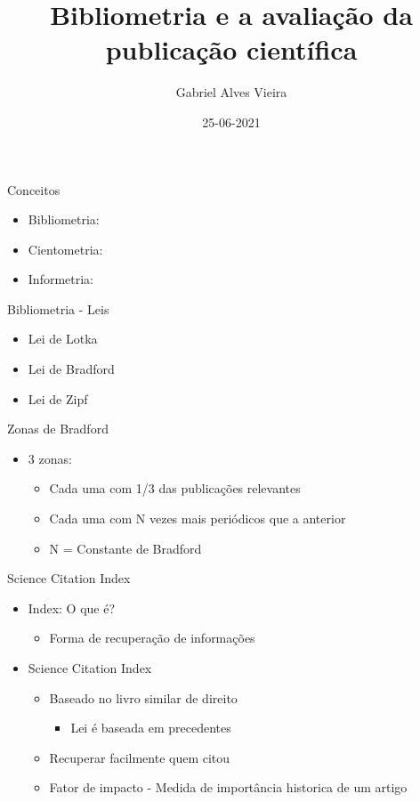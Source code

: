 \documentclass[bigger]{beamer}
\author{Gabriel Alves Vieira}
\date{25-06-2021}
\title{Bibliometria e a avaliação da publicação científica}
\begin{document}
\maketitle

\begin{frame}[label={sec:org1918bc8}]{Conceitos}
\begin{itemize}
\item Bibliometria:
\item Cientometria:
\item Informetria:
\end{itemize}
\end{frame}

\begin{frame}[label={sec:orgd7e64c2}]{Bibliometria - Leis}
\begin{itemize}
\item Lei de Lotka
\item Lei de Bradford
\item Lei de Zipf
\end{itemize}
\end{frame}

\begin{frame}[label={sec:orgcbfc820}]{Zonas de Bradford}
\begin{itemize}
\item 3 zonas:
\begin{itemize}
\item Cada uma com 1/3 das publicações relevantes
\item Cada uma com N vezes mais periódicos que a anterior
\item N = Constante de Bradford
\end{itemize}
\end{itemize}
\end{frame}

\begin{frame}[label={sec:orgde49abb}]{Science Citation Index}
\begin{itemize}
\item Index: O que é?
\begin{itemize}
\item Forma de recuperação de informações
\end{itemize}

\item Science Citation Index \parencite{garfield1955}
\begin{itemize}
\item Baseado no livro similar de direito
\begin{itemize}
\item Lei é baseada em precedentes
\end{itemize}
\item Recuperar facilmente quem citou
\item Fator de impacto - Medida de importância historica de um artigo
\end{itemize}
\end{itemize}
\end{frame}
\end{document}
